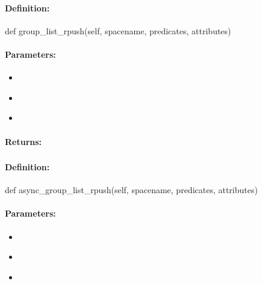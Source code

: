 \paragraph{Definition:}
\begin{pythoncode}
def group_list_rpush(self, spacename, predicates, attributes)
\end{pythoncode}

\paragraph{Parameters:}
\begin{itemize}[noitemsep]
\item {}\\

\item {}\\

\item {}\\

\end{itemize}

\paragraph{Returns:}


\pagebreak
\subsubsection{}
\label{api:python:async_group_list_rpush}


\paragraph{Definition:}
\begin{pythoncode}
def async_group_list_rpush(self, spacename, predicates, attributes)
\end{pythoncode}

\paragraph{Parameters:}
\begin{itemize}[noitemsep]
\item {}\\

\item {}\\

\item {}\\

\end{itemize}

